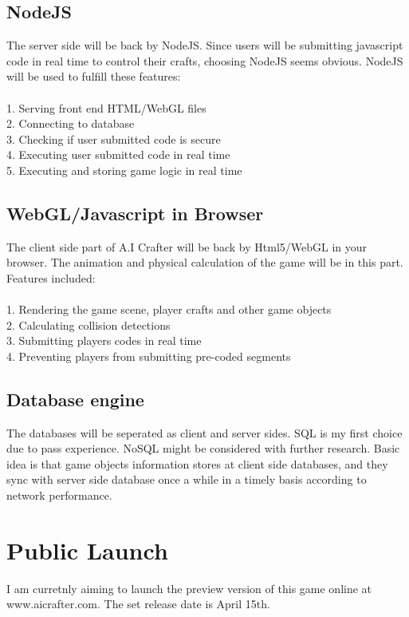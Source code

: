 \documentclass[12pt]{article}
\begin{document}
\subsection{NodeJS}
The server side will be back by NodeJS. Since users will be submitting javascript code in real time to control their crafts, choosing NodeJS seems obvious. NodeJS will be used to fulfill these features:\\
\\
1. Serving front end HTML/WebGL files\\
2. Connecting to database\\
3. Checking if user submitted code is secure\\
4. Executing user submitted code in real time\\
5. Executing and storing game logic in real time\\

\subsection{WebGL/Javascript in Browser}
The client side part of A.I Crafter will be back by Html5/WebGL in your browser.
The animation and physical calculation of the game will be in this part. Features included:\\
\\
1. Rendering the game scene, player crafts and other game objects\\
2. Calculating collision detections\\
3. Submitting players codes in real time\\
4. Preventing players from submitting pre-coded segments\\

\subsection{Database engine}
The databases will be seperated as client and server sides. SQL is my first choice due to pass experience. NoSQL might be considered with further research. Basic idea is that game objects information stores at client side databases, and they sync with server side database once a while in a timely basis according to network performance.

\section{Public Launch}
I am curretnly aiming to launch the preview version of this game online at www.aicrafter.com. The set release date is April 15th. 
\end{document}
